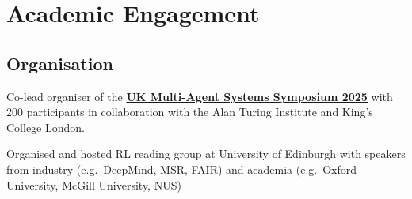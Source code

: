 \documentclass[a4paper,12pt]{article}
\begin{document}
\section{Academic Engagement}

\subsection{Organisation}

\begin{expblock}
    Co-lead organiser of the \href{https://www.turing.ac.uk/events/uk-multi-agent-systems-symposium-2025-uk-mas}{\textbf{UK Multi-Agent Systems Symposium 2025}} with 200 participants in collaboration with the Alan Turing Institute and King's College London.
\end{expblock}

\begin{expblock}
    Organised and hosted RL reading group at University of Edinburgh with speakers from industry (e.g.\ DeepMind, MSR, FAIR) and academia (e.g.\ Oxford University, McGill University, NUS)
\end{expblock}
\end{document}
